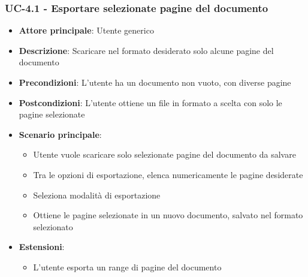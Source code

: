 \documentclass[11pt,a4paper]{article}
\begin{document}
\subsubsection{UC-4.1 - Esportare selezionate pagine del documento}
\begin{itemize}
    \item \textbf{Attore principale}: Utente generico
    \item \textbf{Descrizione}: Scaricare nel formato desiderato solo alcune pagine del documento
    \item \textbf{Precondizioni}: L'utente ha un documento non vuoto, con diverse pagine
    \item \textbf{Postcondizioni}: L'utente ottiene un file in formato a scelta con solo le pagine selezionate
    \item \textbf{Scenario principale}:
        \begin{itemize}
            \item Utente vuole scaricare solo selezionate pagine del documento da salvare
            \item Tra le opzioni di esportazione, elenca numericamente le pagine desiderate
            \item Seleziona modalità di esportazione
            \item Ottiene le pagine selezionate in un nuovo documento, salvato nel formato selezionato
        \end{itemize}
    \item \textbf{Estensioni}:
        \begin{itemize}
            \item L'utente esporta un range di pagine del documento
        \end{itemize}
\end{itemize}
\end{document}

